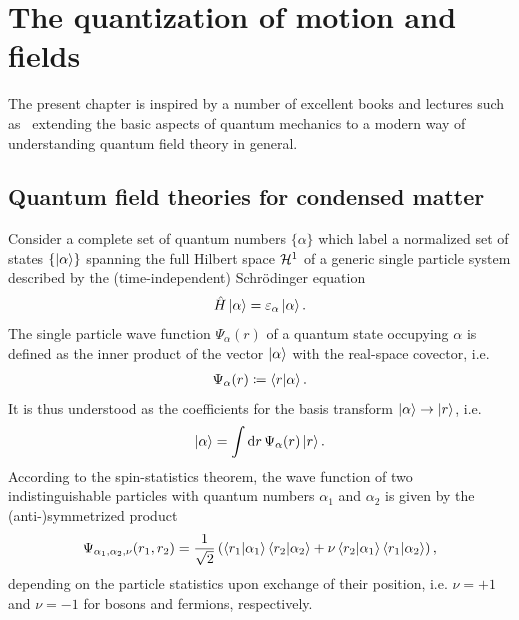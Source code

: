 \chapter{The quantization of motion and fields}
\label{ch:the_quantization_of_motion_and_fields}
The present chapter is inspired by a number of excellent books and lectures such as~\cite{AshcroftMermin1978,AltlandSimons2010,BruusFlensberg2004,Czycholl2016,FetterWalecka2003,Giamarchi2003,Rizzi2016,Burrello2020} extending the basic aspects of quantum mechanics to a modern way of understanding quantum field theory in general.
%
%
\section{Quantum field theories for condensed matter}
\label{sec:creation_and_annihilation_operators}
%
%
Consider a complete set of quantum numbers $\{\alpha\}$ which label a normalized set of states $\{\ket{\alpha}\}$ spanning the full Hilbert space $\mathcal{H}^1$ of a generic single particle system described by the (time-independent) Schrödinger equation
\begin{align}
    \hat H \ket{\alpha} = \varepsilon_\alpha\ket{\alpha}.
\end{align}
The single particle wave function $\Psi_\alpha(r)$ of a quantum state occupying $\alpha$ is defined as the inner product of the vector $\ket{\alpha}$ with the real-space covector, i.e.
\begin{align}
    \Psi_\alpha(r) \coloneqq \braket{r|\alpha}.
\end{align}
It is thus understood as the coefficients for the basis transform $\ket{\alpha}\rightarrow\ket{r}$, i.e.
\begin{align}
    \ket{\alpha} = \int{\rm d}{r}\, \Psi_\alpha(r) \ket{r}.
\end{align}
According to the spin-statistics theorem, the wave function of two indistinguishable particles with quantum numbers $\alpha_1$ and $\alpha_2$ is given by the (anti-)symmetrized product
\begin{align}
    \Psi_{\alpha_1,\alpha_2,\nu}(r_1,r_2) = \frac1{\sqrt2}\left(\braket{r_1|\alpha_1}\braket{r_2|\alpha_2} + \nu\braket{r_2|\alpha_1}\braket{r_1|\alpha_2}\right),
\end{align}
depending on the particle statistics upon exchange of their position, i.e. $\nu=+1$ and $\nu=-1$ for bosons and fermions, respectively.
